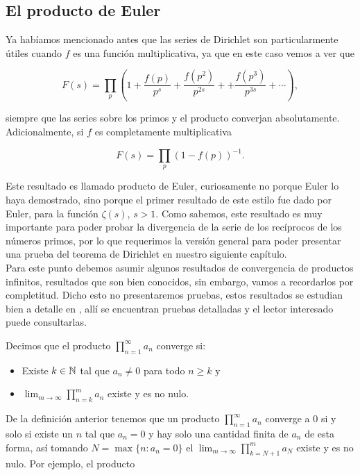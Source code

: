 \subsection{El producto de Euler}

Ya habíamos mencionado antes que las series de Dirichlet son particularmente útiles cuando $f$ es una función multiplicativa, ya que en este caso vemos a ver que

$$
F(s)=\prod_p\left(1+\frac{f(p)}{p^s}+\frac{f\left(p^2\right)}{p^{2 s}}++\frac{f\left(p^3\right)}{p^{3 s}}+\cdots\right),
$$

siempre que las series sobre los primos y el producto converjan absolutamente. Adicionalmente, si $f$ es completamente multiplicativa

$$F(s)=\prod_p(1-f(p))^{-1}.$$

Este resultado es llamado producto de Euler, curiosamente no porque Euler lo haya demostrado, sino porque el primer resultado de este estilo fue dado por Euler, para la función $\zeta(s)$, $s>1$. Como sabemos, este resultado es muy importante para  poder probar la divergencia de la serie de los recíprocos de los números primos, por lo que requerimos la versión general para  poder presentar una prueba del teorema de Dirichlet en nuestro siguiente capítulo.\\


Para este punto debemos asumir algunos resultados de convergencia de productos infinitos, resultados que son bien conocidos, sin embargo, vamos a recordarlos por completitud. Dicho esto no presentaremos pruebas, estos resultados se estudian bien a detalle en \cite{Apostol:105425}, allí se encuentran pruebas detalladas y el lector interesado puede consultarlas.

\begin{definition}
Decimos que el producto $\displaystyle \prod_{n=1}^{\infty} a_n$ converge si:
\begin{itemize}[label=$\bullet$]
\item Existe $k\in \mathbb{N}$ tal que $a_n\neq 0$ para todo $n\geq k$ y
\item $\displaystyle\lim_{m \to \infty} \prod_{n=k}^{m}a_n$ existe y es  no nulo.
\end{itemize}
\end{definition}

De la definición anterior tenemos que un producto $\displaystyle\prod_{n=1}^{\infty} a_n$ converge a 0 si y solo si existe un $n$ tal que $a_n=0$ y hay solo una cantidad finita de $a_n$ de esta forma, así tomando $N=\max\{n: a_n=0\}$ el $\lim_{m \to \infty} \displaystyle\prod_{k=N+1}^{m}a_N$ existe y es no nulo. Por ejemplo, el producto

